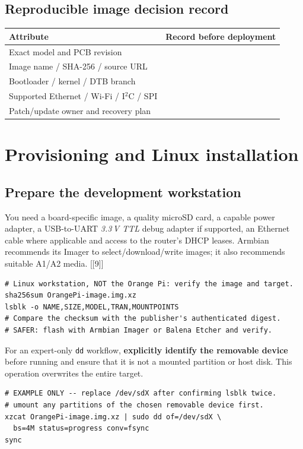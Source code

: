\documentclass[10pt,oneside,openany]{report}
\newcommand{\code}[1]{\texttt{#1}}
\newcommand{\smallref}[1]{{\sffamily\scriptsize\color{slate}[#1]}}
\begin{document}
\section{Reproducible image decision record}
\begin{center}\small\begin{tabularx}{\textwidth}{@{}p{3.6cm}X@{}}\toprule
\textbf{Attribute} & \textbf{Record before deployment}\\\midrule
Exact model and PCB revision & \rule{0pt}{2.1ex}\dotfill\\
Image name / SHA-256 / source URL & \dotfill\\
Bootloader / kernel / DTB branch & \dotfill\\
Supported Ethernet / Wi-Fi / I\(^{2}\)C / SPI & \dotfill\\
Patch/update owner and recovery plan & \dotfill\\\bottomrule\end{tabularx}\end{center}

\chapter{Provisioning and Linux installation}
\section{Prepare the development workstation}
You need a board-specific image, a quality microSD card, a capable power adapter, a USB-to-UART \emph{3.3\,V TTL} debug adapter if supported, an Ethernet cable where applicable and access to the router's DHCP leases. Armbian recommends its Imager to select/download/write images; it also recommends suitable A1/A2 media. \smallref{[9]}
\begin{lstlisting}[style=sh]
# Linux workstation, NOT the Orange Pi: verify the image and target.
sha256sum OrangePi-image.img.xz
lsblk -o NAME,SIZE,MODEL,TRAN,MOUNTPOINTS
# Compare the checksum with the publisher's authenticated digest.
# SAFER: flash with Armbian Imager or Balena Etcher and verify.
\end{lstlisting}
For an expert-only \code{dd} workflow, \textbf{explicitly identify the removable device} before running and ensure that it is not a mounted partition or host disk. This operation overwrites the entire target.
\begin{lstlisting}[style=sh]
# EXAMPLE ONLY -- replace /dev/sdX after confirming lsblk twice.
# umount any partitions of the chosen removable device first.
xzcat OrangePi-image.img.xz | sudo dd of=/dev/sdX \
  bs=4M status=progress conv=fsync
sync
\end{lstlisting}
\end{document}
